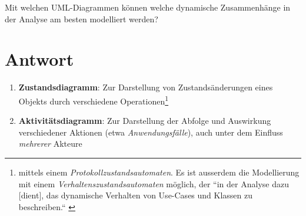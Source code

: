 Mit welchen UML-Diagrammen können welche dynamische Zusammenhänge in der Analyse am besten modelliert werden?


\section*{Antwort}

\begin{enumerate}
    \item \textbf{Zustandsdiagramm}: Zur Darstellung von Zustandsänderungen eines Objekts durch verschiedene Operationen\footnote{
    mittels einem \textit{Protokollzustandsautomaten}.
    Es ist ausserdem die Modellierung mit einem \textit{Verhaltenszustandsautomaten} möglich, der  ``in der Analyse dazu [dient], das dynamische Verhalten von Use-Cases und Klassen zu beschreiben.`` \cite[548]{Bal05}
    }
    \item \textbf{Aktivitätsdiagramm}: Zur Darstellung der Abfolge und Auswirkung verschiedener Aktionen (etwa \textit{Anwendungsfälle}), auch unter dem Einfluss \textit{mehrerer} Akteure

\end{enumerate}